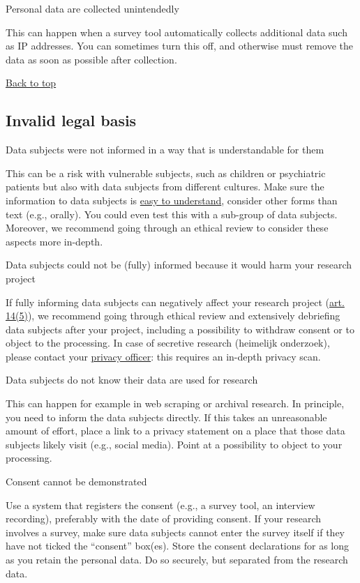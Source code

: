 \documentclass[
]{book}
\begin{document}
Personal data are collected unintendedly

This can happen when a survey tool automatically collects additional data such
as IP addresses. You can sometimes turn this off, and otherwise must remove the
data as soon as possible after collection.

\protect\hyperlink{example-risks}{Back to top}

\hypertarget{invalid-legal-basis}{%
\subsection{Invalid legal basis}\label{invalid-legal-basis}}

Data subjects were not informed in a way that is
understandable for them

This can be a risk with vulnerable subjects, such as children or psychiatric
patients but also with data subjects from different cultures. Make sure the
information to data subjects is \protect\hyperlink{form-of-a-privacy-notice}{easy to understand},
consider other forms than text (e.g., orally). You could even test this with a
sub-group of data subjects. Moreover, we recommend going through an ethical
review to consider these aspects more in-depth.

Data subjects could not be (fully) informed because it would
harm your research project

If fully informing data subjects can negatively affect your research project
(\href{https://gdpr-info.eu/art-14-gdpr/}{art. 14(5)}), we recommend
going through ethical review and extensively debriefing data subjects after your
project, including a possibility to withdraw consent or to object to the
processing. In case of secretive research (heimelijk onderzoek), please contact
your \protect\hyperlink{support}{privacy officer}: this requires an in-depth privacy scan.

Data subjects do not know their data are used for research

This can happen for example in web scraping or archival research. In principle,
you need to inform the data subjects directly. If this takes an unreasonable
amount of effort, place a link to a privacy statement on a place that those
data subjects likely visit (e.g., social media). Point at a possibility to
object to your processing.

Consent cannot be demonstrated

Use a system that registers the consent (e.g., a survey tool, an interview
recording), preferably with the date of providing consent. If your research
involves a survey, make sure data subjects cannot enter the survey itself if
they have not ticked the ``consent'' box(es). Store the consent declarations for
as long as you retain the personal data. Do so securely, but separated from the
research data.
\end{document}
